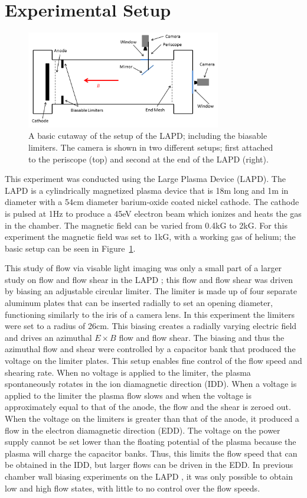 \documentclass{jpp}
\begin{document}
\section{Experimental Setup}  %

\begin{figure} 
\centerline{\includegraphics[width=8.5cm]{plot_of_LAPD}}
\caption{A basic cutaway of the setup of the LAPD; including the biasable limiters. The camera is shown in two different setups; first attached to the periscope (top) and second at the end of the LAPD (right).}
\label{fig:plot_of_LAPD}
\end{figure}


This experiment was conducted using the Large Plasma Device (LAPD). The LAPD is a cylindrically magnetized plasma device that is 18m long and 1m in diameter with a 54cm diameter barium-oxide coated nickel cathode. The cathode is pulsed at 1Hz to produce a 45eV electron beam which ionizes and heats the gas in the chamber. The magnetic field can be varied from 0.4kG to 2kG. For this experiment the magnetic field was set to 1kG, with a working gas of helium; the basic setup can be seen in Figure~\ref{fig:plot_of_LAPD}.

This study of flow via visable light imaging was only a small part of a larger study on flow and flow shear in the LAPD \citep{schaffner12, schaffner13}; this flow and flow shear was driven by biasing an adjustable circular limiter. The limiter is made up of four separate aluminum plates that can be inserted radially to set an opening diameter, functioning similarly to the iris of a camera lens. In this experiment the limiters were set to a radius of 26cm. This biasing creates a radially varying electric field and drives an azimuthal $E \times B$ flow and flow shear. The biasing and thus the azimuthal flow and shear were controlled by a capacitor bank that produced the voltage on the limiter plates. This setup enables fine control of the flow speed and shearing rate. When no voltage is applied to the limiter, the plasma spontaneously rotates in the ion diamagnetic direction (IDD).  When a voltage is applied to the limiter the plasma flow slows and when the voltage is approximately equal to that of the anode, the flow and the shear is zeroed out.  When the voltage on the limiters is greater than that of the anode, it produced a flow in the electron diamagnetic direction (EDD). The voltage on the power supply cannot be set lower than the floating potential of the plasma because the plasma will charge the capacitor banks. Thus, this limits the flow speed that can be obtained in the IDD, but larger flows can be driven in the EDD. In previous chamber wall biasing experiments on the LAPD \citep{Carter09}, it was only possible to obtain low and high flow states, with little to no control over the flow speeds.
\end{document}
